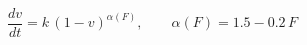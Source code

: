 \begin{equation}
  \frac{dv}{dt} = k\,(1 - v)^{\alpha(F)}, \qquad \alpha(F) = 1.5 - 0.2\,F
\end{equation}
